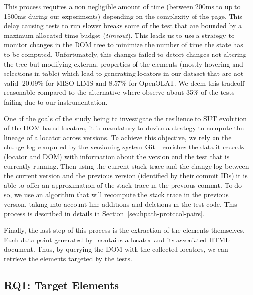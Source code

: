 This process requires a non negligible amount of time (between 200ms to up to 1500ms during our experiments) depending on the complexity of the page. This delay causing tests to run slower breaks some of the test that are bounded by a maximum allocated time budget (\emph{timeout}). This leads us to use a strategy to monitor changes in the DOM tree to minimize the number of time the state has to be computed. Unfortunately, this changes failed to detect changes not altering the tree but modifying external properties of the elements (mostly hovering and selections in table) which lead to generating locators in our dataset that are not valid, 20.09\% for MISO LIMS and 8.57\% for OpenOLAT. We deem this tradeoff reasonable compared to the alternative where observe about 35\% of the tests failing due to our instrumentation.

One of the goals of the study being to investigate the resilience to SUT evolution of the DOM-based locators, it is mandatory to devise a strategy to compute the lineage of a locator across versions. To achieve this objective, we rely on the change log computed by the versioning system Git. \mercator\ enriches the data it records (locator and DOM) with information about the version and the test that is currently running. Then using the current stack trace and the change log between the current version and the previous version (identified by their commit IDs) it is able to offer an approximation of the stack trace in the previous commit. To do so, we use an algorithm that will recompute the stack trace in the previous version, taking into account line additions and deletions in the test code. This process is described in details in Section~\ref{sec:hpath-protocol-pairs}.

Finally, the last step of this process is the extraction of the elements themselves. Each data point generated by \mercator\ contains a locator and its associated HTML document. Thus, by querying the DOM with the collected locators, we can retrieve the elements targeted by the tests.

\subsection{RQ1: Target Elements}
\label{sec:hpath-protocol-rq1}



